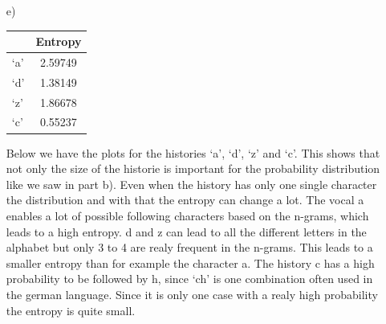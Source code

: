 \documentclass{article}
\begin{document}
\begin{itemize}
	\item[e)]
	\begin{table}[h]
		\begin{tabular}{l|c}
		 & Entropy \\ \hline
		 `a'& 2.59749\\
		 `d'& 1.38149 \\
		 `z'& 1.86678\\
		 `c'& 0.55237 \\
		\end{tabular}
	\end{table}
	Below we have the plots for the histories `a', `d', `z' and `c'. This shows that not only the size of the historie is important for the probability distribution like we saw in part b). Even when the history has only one single character the distribution and with that the entropy can change a lot. The vocal a enables a lot of possible following characters based on the n-grams, which leads to a high entropy. d and z can lead to all the different letters in the alphabet but only 3 to 4 are realy frequent in the n-grams. This leads to a smaller entropy than for example the character a. The history c has a high probability to be followed by h, since `ch' is one combination often used in the german language. Since it is only one case with a realy high probability the entropy is quite small.


\end{itemize}
\end{document}
